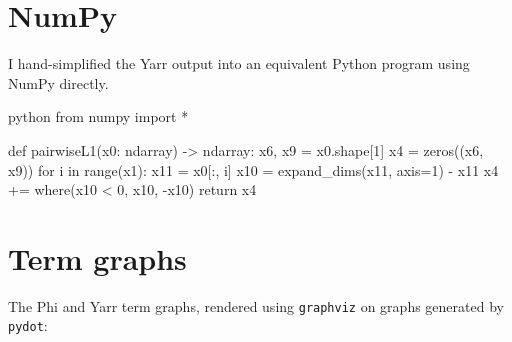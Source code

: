 \section*{NumPy}

I hand-simplified the Yarr output into an equivalent Python program using NumPy directly. 

\begin{center}    
\begin{cminted}{python}
from numpy import *

def pairwiseL1(x0: ndarray) -> ndarray:
    x6, x9 = x0.shape[1]
    x4 = zeros((x6, x9))
    for i in range(x1):
        x11 = x0[:, i]
        x10 = expand_dims(x11, axis=1) - x11
        x4 += where(x10 < 0, x10, -x10)
    return x4
\end{cminted}
\end{center}

\clearpage
\section*{Term graphs}

The Phi and Yarr term graphs, rendered using \texttt{graphviz} on graphs generated by \texttt{pydot}:

